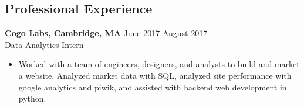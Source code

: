 \documentclass[margin, 10pt]{res} %
\begin{document}
\begin{resume}
\section{Professional Experience}
{\textbf{Cogo Labs, Cambridge, MA}} \hfill June 2017-August 2017 \\
Data Analytics Intern
\begin{itemize}
\item Worked with a team of engineers, designers, and analysts to build and market a website. Analyzed market data with SQL, analyzed site performance with google analytics and piwik, and assisted with backend web development in python. 
\end{itemize}




\end{resume}
\end{document}
